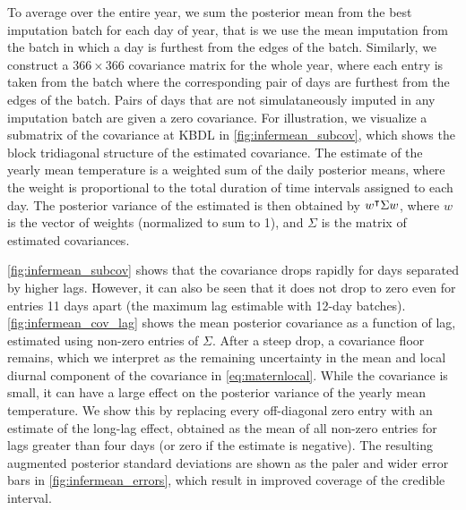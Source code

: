 To average over the entire year, we sum the posterior mean from the best imputation batch
for each day of year, that is we use the mean imputation from the batch
in which a day is furthest from the edges of the batch.
Similarly, we construct a $366 \times 366$ covariance matrix for the whole year,
where each entry is taken from the batch where the corresponding pair of days
are furthest from the edges of the batch.
Pairs of days that are not simulataneously imputed in any imputation batch are
given a zero covariance.
For illustration, we visualize a submatrix of the covariance at KBDL in
\autoref{fig:infermean_subcov}, which shows the block tridiagonal
structure of the estimated covariance.
The estimate of the yearly mean temperature is a weighted sum of the daily posterior means,
where the weight is proportional to the total duration of time intervals assigned to each day.
The posterior variance of the estimated is then obtained by $w^{\intercal} \Sigma w$,
where $w$ is the vector of weights (normalized to sum to 1), and $\Sigma$ is the matrix of
estimated covariances.

\autoref{fig:infermean_subcov} shows that the covariance drops rapidly
for days separated by higher lags.
However, it can also be seen that it does not drop to zero even for entries 11 days apart
(the maximum lag estimable with 12-day batches).
\autoref{fig:infermean_cov_lag} shows the mean posterior covariance as a function of lag,
estimated using non-zero entries of $\Sigma$.
After a steep drop, a covariance floor remains, which we interpret
as the remaining uncertainty in the mean and local diurnal component of the
covariance in \autoref{eq:maternlocal}.
While the covariance is small, it can have a large effect on the posterior variance
of the yearly mean temperature.
We show this by replacing every off-diagonal zero entry with an estimate of the
long-lag effect, obtained as the mean of all non-zero entries for lags greater than four days
(or zero if the estimate is negative).
The resulting augmented posterior standard deviations are shown as the paler and wider error bars
in \autoref{fig:infermean_errors}, which result in improved coverage of the credible interval.

